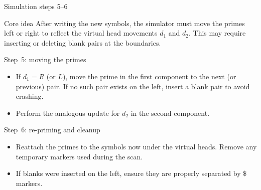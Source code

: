\begin{frame}[t]{Simulation steps 5–6}
  \begin{tblock}{Core idea}
    After writing the new symbols, the simulator must move the primes
    left or right to reflect the virtual head movements $d_1$ and
    $d_2$.  This may require inserting or deleting blank pairs at
    the boundaries.
  \end{tblock}
  \begin{tblock}{Step 5: moving the primes}
    \begin{itemize}
      \item If $d_1=R$ (or $L$), move the prime in the first component to
        the next (or previous) pair.  If no such pair exists on the
        left, insert a blank pair to avoid crashing.
      \item Perform the analogous update for $d_2$ in the second
        component.
    \end{itemize}
  \end{tblock}
  \begin{tblock}{Step 6: re‑priming and cleanup}
    \begin{itemize}
      \item Reattach the primes to the symbols now under the virtual
        heads.  Remove any temporary markers used during the scan.
      \item If blanks were inserted on the left, ensure they are
        properly separated by $\$$ markers.
    \end{itemize}
  \end{tblock}
  \label{fr:7.5-07}
\end{frame}


